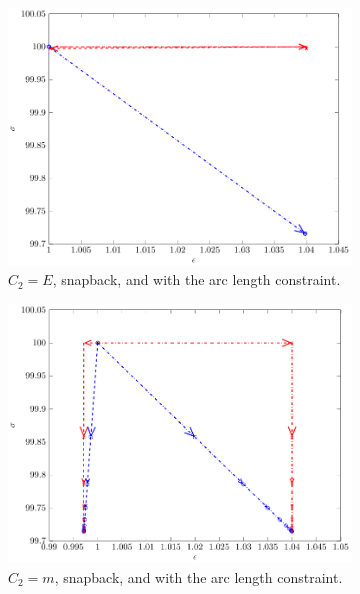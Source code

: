 \documentclass[10pt]{elsarticle}
\begin{document}
\begin{figure}\ContinuedFloat
	\begin{subfigure}{0.45\textwidth}
		\centering
		\includegraphics[scale=0.7]{./conv_figs/bad_metric_snap_arc_length.pdf}
		\caption{$C_2=E$, snapback, and with the arc length constraint.}
		\label{bad_metric_snap_arc_length}
	\end{subfigure}
	\hfill
	\begin{subfigure}{0.45\textwidth}
		\centering
		\includegraphics[scale=0.7]{./conv_figs/good_metric_snap_arc_length.pdf}
		\caption{$C_2=m$, snapback, and with the arc length constraint.}
		\label{good_metric_snap_arc_length}
	\end{subfigure}
	\begin{subfigure}{0.45\textwidth}

\end{subfigure}
\end{figure}
\end{document}

